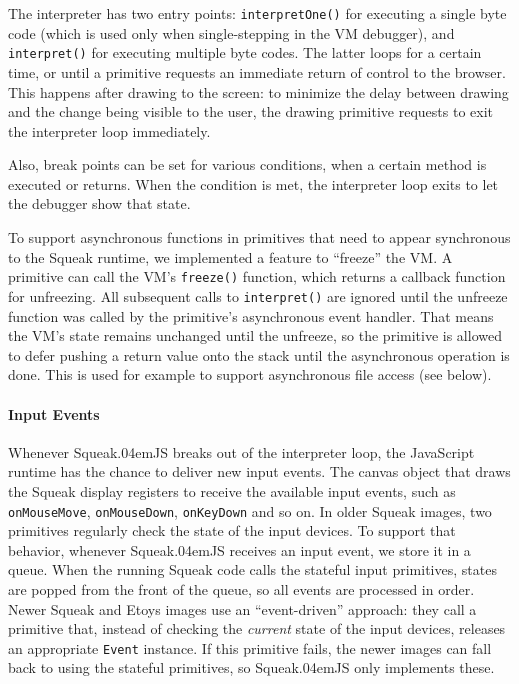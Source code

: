 \documentclass[natbib]{sigplanconf}
\newcommand*\SqueakJS{Squeak\texorpdfstring{\kern.04em}{}JS\xspace}
\newcommand*\JS{JavaScript\xspace}
\begin{document}
The interpreter has two entry points: \lstinline|interpretOne()| for
executing a single byte code (which is used only when single-stepping
in the \ac{VM} debugger), and \lstinline|interpret()| for executing
multiple byte codes. The latter loops for a certain time, or until a
primitive requests an immediate return of control to the browser. This
happens \eg after drawing to the screen: to minimize the delay between
drawing and the change being visible to the user, the drawing
primitive requests to exit the interpreter loop immediately.

Also, break points can be set for various conditions, \eg when a
certain method is executed or returns. When the condition is met, the
interpreter loop exits to let the debugger show that state.

To support asynchronous functions in primitives that need to appear
synchronous to the Squeak runtime, we implemented a feature to
``freeze'' the \ac{VM}. A primitive can call the \ac{VM}'s
\lstinline|freeze()| function, which returns a callback function for
unfreezing. All subsequent calls to \lstinline|interpret()| are
ignored until the unfreeze function was called by the primitive's
asynchronous event handler. That means the \ac{VM}'s state remains
unchanged until the unfreeze, so the primitive is allowed to defer
pushing a return value onto the stack until the asynchronous operation
is done. This is used for example to support asynchronous file access
(see below).

\paragraph{Input Events}
Whenever \SqueakJS breaks out of the interpreter loop, the \JS
runtime has the chance to deliver new input events. The canvas object
that draws the Squeak display registers to receive the available input
events, such as \lstinline|onMouseMove|, \lstinline|onMouseDown|,
\lstinline|onKeyDown| and so on. In older Squeak images, two
primitives regularly check the state of the input devices. To support
that behavior, whenever \SqueakJS receives an input event, we store it
in a queue. When the running Squeak code calls the stateful input
primitives, states are popped from the front of the queue, so all
events are processed in order. Newer Squeak and Etoys images use an
``event-driven'' approach: they call a primitive that, instead of
checking the \emph{current} state of the input devices, releases an
appropriate \lstinline|Event| instance. If this primitive fails, the
newer images can fall back to using the stateful primitives, so
\SqueakJS only implements these.
\end{document}
